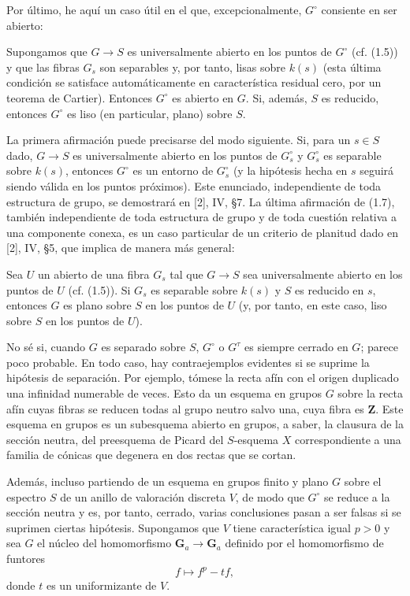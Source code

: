 Por último, he aquí un caso útil en el que, excepcionalmente, $G^\circ$
consiente en ser abierto:

 Supongamos que $G\longrightarrow S$ es universalmente
abierto en los puntos de $G^\circ$ (cf. (1.5)) y que las fibras $G_s$ son
separables y, por tanto, lisas sobre $k(s)$ (esta última condición se satisface
automáticamente en característica residual cero, por un teorema de Cartier).
Entonces $G^\circ$ es abierto en $G$. Si, además, $S$ es reducido, entonces
$G^\circ$ es liso (en particular, plano) sobre $S$.

La primera afirmación puede precisarse del modo siguiente. Si, para un
$s\in S$ dado, $G\longrightarrow S$ es universalmente abierto en los puntos de
$G_s^\circ$ y $G_s^\circ$ es separable sobre $k(s)$, entonces $G^\circ$ es un
entorno de $G_s^\circ$ (y la hipótesis hecha en $s$ seguirá siendo válida en
los puntos próximos). Este enunciado, independiente de toda estructura de
grupo, se demostrará en [2], IV, §7. La última afirmación de (1.7), también
independiente de toda estructura de grupo y de toda cuestión relativa a una
componente conexa, es un caso particular de un criterio de planitud dado en
[2], IV, §5, que implica de manera más general:

 Sea $U$ un abierto de una fibra $G_s$ tal que
$G\longrightarrow S$ sea universalmente abierto en los puntos de $U$ (cf.
(1.5)). Si $G_s$ es separable sobre $k(s)$ y $S$ es reducido en $s$, entonces
$G$ es plano sobre $S$ en los puntos de $U$ (y, por tanto, en este caso, liso
sobre $S$ en los puntos de $U$).

 No sé si, cuando $G$ es separado sobre $S$,
$G^\circ$ o $G^\tau$ es siempre cerrado en $G$; parece poco probable. En todo
caso, hay contraejemplos evidentes si se suprime la hipótesis de separación.
Por ejemplo, tómese la recta afín con el origen duplicado una infinidad
numerable de veces. Esto da un esquema en grupos $G$ sobre la recta afín cuyas
fibras se reducen todas al grupo neutro salvo una, cuya fibra es $\mathbf Z$.
Este esquema en grupos es un subesquema abierto en grupos, a saber, la clausura
de la sección neutra, del preesquema de Picard del $S$-esquema $X$
correspondiente a una familia de cónicas que degenera en dos rectas que se
cortan.

Además, incluso partiendo de un esquema en grupos finito y plano $G$ sobre el
espectro $S$ de un anillo de valoración discreta $V$, de modo que $G^\circ$ se
reduce a la sección neutra y es, por tanto, cerrado, varias conclusiones pasan
a ser falsas si se suprimen ciertas hipótesis. Supongamos que $V$ tiene
característica igual $p>0$ y sea $G$ el núcleo del homomorfismo
$\mathbf G_a\longrightarrow\mathbf G_a$ definido por el homomorfismo de
funtores
\[
f\longmapsto f^p-tf,
\]
donde $t$ es un uniformizante de $V$.

